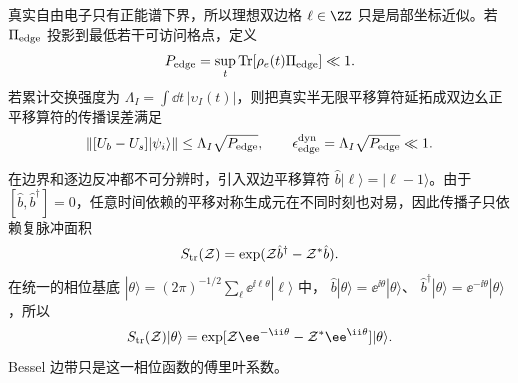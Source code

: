 真实自由电子只有正能谱下界，所以理想双边格 $\ell\in\ZZ$ 只是局部坐标近似。若 $\Pi_{\rm edge}$ 投影到最低若干可访问格点，定义
\begin{equation}
{
P_{\rm edge}
=\sup_t\operatorname{Tr}[\rho_e(t)\Pi_{\rm edge}]\ll1.}
\label{eq:bilateral_ladder_edge_condition}
\end{equation}
若累计交换强度为 $\Lambda_I=\int\dd t\,|\upsilon_I(t)|$，则把真实半无限平移算符延拓成双边幺正平移算符的传播误差满足
\begin{equation}
{
\|[U_b-U_s]|\psi_i\rangle\|
\le\Lambda_I\sqrt{P_{\rm edge}},
\qquad
\epsilon_{\rm edge}^{\rm dyn}=\Lambda_I\sqrt{P_{\rm edge}}\ll1.}
\label{eq:bilateral_ladder_dynamical_error}
\end{equation}

在边界和逐边反冲都不可分辨时，引入双边平移算符 $\hat b|\ell\rangle=|\ell-1\rangle$。由于 $[\hat b,\hat b^\dagger]=0$，任意时间依赖的平移对称生成元在不同时刻也对易，因此传播子只依赖复脉冲面积
\begin{equation}
{
S_{\rm tr}(\mathcal Z)
=\exp(\mathcal Z \hat b^\dagger-\mathcal Z^*\hat b).}
\label{eq:universal_translation_propagator}
\end{equation}
在统一的相位基底
$|\theta\rangle=(2\pi)^{-1/2}\sum_\ell \ee^{\ii\ell\theta}|\ell\rangle$
中，
$\hat b|\theta\rangle=\ee^{\ii\theta}|\theta\rangle$、
$\hat b^\dagger|\theta\rangle=\ee^{-\ii\theta}|\theta\rangle$，所以
\begin{equation}
{
S_{\rm tr}(\mathcal Z)|\theta\rangle
=\exp[\mathcal Z \ee^{-\ii\theta}-\mathcal Z^*\ee^{\ii\theta}]|\theta\rangle.}
\label{eq:universal_translation_phase_solution}
\end{equation}
Bessel 边带只是这一相位函数的傅里叶系数。

